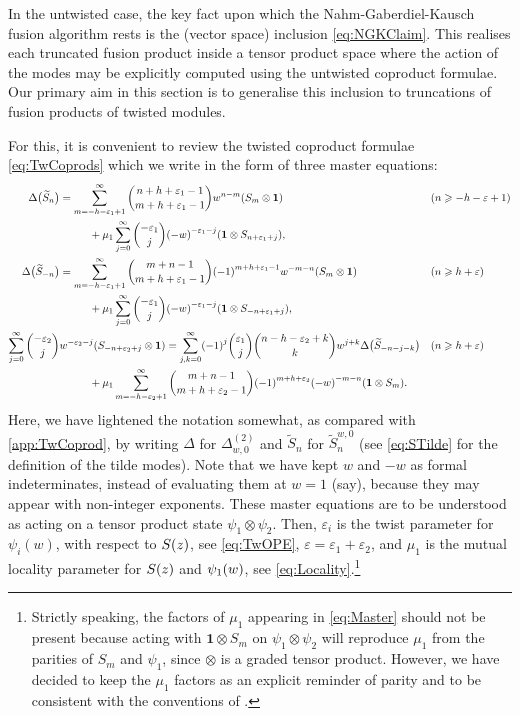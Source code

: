 \documentclass[a4paper,reqno,12pt]{report}
\theoremstyle{definition}
\numberwithin{equation}{section}
\let\originalleft\left     %
\let\originalright\right
\renewcommand{\left}{\mathopen{}\mathclose\bgroup\originalleft}
\renewcommand{\right}{\aftergroup\egroup\originalright}
\newcommand{\func}[2]{#1 \left( #2 \right)} %
\newcommand{\brac}[1]{\left( #1 \right)}
\newcommand{\wun}{\mathbf{1}}  %
\newcommand{\coproductsymb}{\Delta}                                                %
\newcommand{\coproduct}[1]{\coproductsymb \bigl( #1 \bigr)}                        %
\newcommand{\Ncoproductsymb}[1]{\coproductsymb^{(#1)}}                             %
\newcommand{\parNcoproductsymb}[2]{\Ncoproductsymb{#1}_{#2}}                       %
\newcommand{\NGK}{Nahm-Gaberdiel-Kausch}
\newcommand{\eps}{\varepsilon}
\newcommand{\tS}{\widetilde{S}}
\renewcommand{\ge}{\geqslant}
\theoremstyle{plain}
\begin{document}
In the untwisted case, the key fact upon which the \NGK{} fusion algorithm rests is the (vector space) inclusion  \eqref{eq:NGKClaim}.  This realises each truncated fusion product inside a tensor product space where the action of the modes may be explicitly computed using the untwisted coproduct formulae.  Our primary aim in this section is to generalise this inclusion to truncations of fusion products of twisted modules.  

For this, it is convenient to review the twisted coproduct formulae \eqref{eq:TwCoprods} which we write in the form of three master equations:
\begin{subequations} \label{eq:Master}
\begin{align}
\coproduct{\tS_n} &= \sum_{m=-h-\eps_1+1}^{\infty} \binom{n+h+\eps_1-1}{m+h+\eps_1-1} w^{n-m} \brac{S_m \otimes \wun} & &\text{(\(n \ge -h-\eps+1\))} \notag \\
&\mspace{50mu} + \mu_1 \sum_{j=0}^{\infty} \binom{-\eps_1}{j} \brac{-w}^{-\eps_1-j} \brac{\wun \otimes S_{n+\eps_1+j}}, \label{eq:Master1} \\
\coproduct{\tS_{-n}} &= \sum_{m=-h-\eps_1+1}^{\infty} \binom{m+n-1}{m+h+\eps_1-1} \brac{-1}^{m+h+\eps_1-1} w^{-m-n} \brac{S_m \otimes \wun} & &\text{(\(n \ge h+\eps\))} \notag \\
&\mspace{50mu} + \mu_1 \sum_{j=0}^{\infty} \binom{-\eps_1}{j} \brac{-w}^{-\eps_1-j} \brac{\wun \otimes S_{-n+\eps_1+j}}, \label{eq:Master2} \\
\sum_{j=0}^{\infty} \binom{-\eps_2}{j} &w^{-\eps_2-j} \brac{S_{-n+\eps_2+j} \otimes \wun} = \sum_{j,k=0}^{\infty} \brac{-1}^j \binom{\eps_1}{j} \binom{n-h-\eps_2+k}{k} w^{j+k} \coproduct{\tS_{-n-j-k}} & &\text{(\(n \ge h+\eps\))} \notag \\
&\mspace{50mu} + \mu_1 \sum_{m=-h-\eps_2+1}^{\infty} \binom{m+n-1}{m+h+\eps_2-1} \brac{-1}^{m+h+\eps_2} \brac{-w}^{-m-n} \brac{\wun \otimes S_m}. \label{eq:Master3}
\end{align}
\end{subequations}
Here, we have lightened the notation somewhat, as compared with \cref{app:TwCoprod}, by writing $\coproductsymb$ for $\parNcoproductsymb{2}{w,0}$ and $\tS_n$ for $\tS_n^{w,0}$ (see \eqref{eq:STilde} for the definition of the tilde modes).  Note that we have kept $w$ and $-w$ as formal indeterminates, instead of evaluating them at $w=1$ (say), because they may appear with non-integer exponents.  These master equations are to be understood as acting on a tensor product state $\psi_1 \otimes \psi_2$.  Then, $\eps_i$ is the twist parameter for $\psi_i(w)$, with respect to $\func{S}{z}$, see \eqref{eq:TwOPE}, $\eps = \eps_1 + \eps_2$, and $\mu_1$ is the mutual locality parameter for $\func{S}{z}$ and $\func{\psi_1}{w}$, see \eqref{eq:Locality}.\footnote{Strictly speaking, the factors of $\mu_1$ appearing in \eqref{eq:Master} should not be present because acting with $\wun \otimes S_m$ on $\psi_1 \otimes \psi_2$ will reproduce $\mu_1$ from the parities of $S_m$ and $\psi_1$, since $\otimes$ is a graded tensor product.  However, we have decided to keep the $\mu_1$ factors as an explicit reminder of parity and to be consistent with the conventions of \cite{GabFus94b,GabFus97}.}
\end{document}
